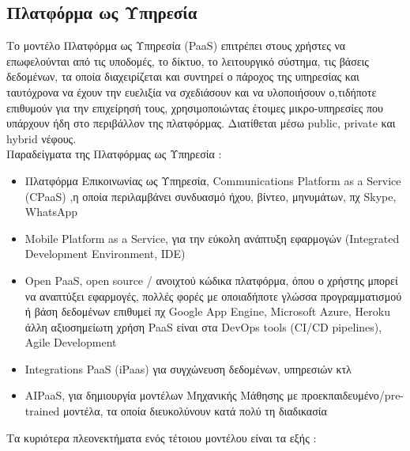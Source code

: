 \documentclass{article}
\begin{document}
\subsection{Πλατφόρμα ως Υπηρεσία}
Το μοντέλο Πλατφόρμα ως Υπηρεσία (PaaS) επιτρέπει στους χρήστες να επωφελούνται από τις υποδομές, το δίκτυο, το λειτουργικό σύστημα, τις βάσεις δεδομένων, τα οποία διαχειρίζεται και συντηρεί ο πάροχος της υπηρεσίας και ταυτόχρονα να έχουν την ευελιξία να σχεδιάσουν και να υλοποιήσουν ο,τιδήποτε επιθυμούν για την επιχείρησή τους, χρησιμοποιώντας έτοιμες μικρο-υπηρεσίες που υπάρχουν ήδη στο περιβάλλον της πλατφόρμας. Διατίθεται μέσω  public, private και hybrid νέφους. \\
Παραδείγματα της Πλατφόρμας ως Υπηρεσία :
\begin{itemize}
\item Πλατφόρμα Επικοινωνίας ως Υπηρεσία, Communications Platform as a Service    (CPaaS) ,η οποία περιλαμβάνει συνδυασμό ήχου, βίντεο, μηνυμάτων, πχ Skype, WhatsApp
\item Mobile Platform as a Service, για την εύκολη ανάπτυξη εφαρμογών (Integrated Development Environment, IDE)
\item Open PaaS, open source / ανοιχτού κώδικα πλατφόρμα, όπου ο χρήστης μπορεί να αναπτύξει εφαρμογές, πολλές φορές με οποιαδήποτε γλώσσα προγραμματισμού ή βάση δεδομένων επιθυμεί πχ Google App Engine, Microsoft Azure, Heroku
 άλλη αξιοσημείωτη χρήση PaaS είναι στα DevOps tools (CI/CD pipelines), Agile Development
\item Integrations PaaS (iPaas) για συγχώνευση δεδομένων, υπηρεσιών κτλ
\item {}AIPaaS, για δημιουργία μοντέλων Μηχανικής Μάθησης με προεκπαιδευμένο/pre-trained μοντέλα, τα οποία διευκολύνουν κατά πολύ τη διαδικασία 
\end{itemize}
Τα κυριότερα πλεονεκτήματα ενός τέτοιου μοντέλου είναι τα εξής :
\end{document}
